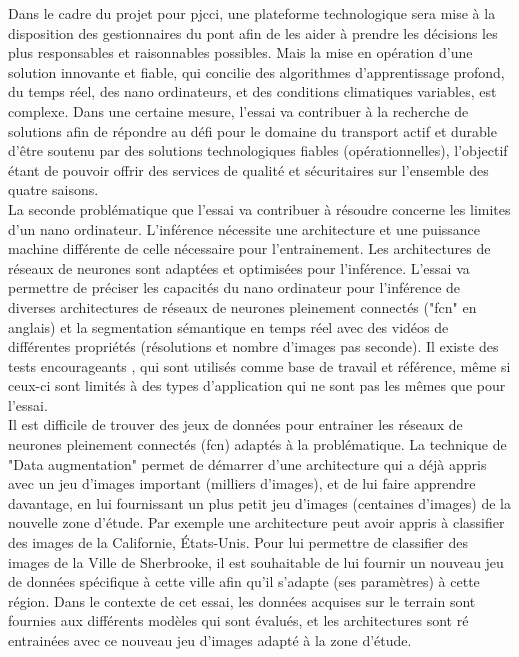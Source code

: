 ﻿\noindent Dans le cadre du projet pour \acrshort{pjcci}, une plateforme technologique sera mise à la disposition des gestionnaires du pont afin de les aider à prendre les décisions les plus responsables et raisonnables possibles. Mais la mise en opération d'une solution innovante et fiable, qui concilie des algorithmes d'apprentissage profond, du temps réel, des nano ordinateurs, et des conditions climatiques variables, est complexe. Dans une certaine mesure, l'essai va contribuer à la recherche de solutions afin de répondre au défi pour le domaine du transport actif et durable d'être soutenu par des solutions technologiques fiables (opérationnelles), l'objectif étant de pouvoir offrir des services de qualité et sécuritaires sur l'ensemble des quatre saisons.
\vspace{\baselineskip}
\\
\noindent La seconde problématique que l'essai va contribuer à résoudre concerne les limites d'un nano ordinateur. L'inférence nécessite une architecture et une puissance machine différente de celle nécessaire pour l'entrainement. Les architectures de réseaux de neurones sont adaptées et optimisées pour l'inférence. L'essai va permettre de préciser les capacités du nano ordinateur pour l'inférence de diverses architectures de réseaux de neurones pleinement connectés ("\acrshort{fcn}" en anglais) et la segmentation sémantique en temps réel avec des vidéos de différentes propriétés (résolutions et nombre d'images pas seconde). Il existe des tests encourageants \parencite{nvidia_jetson_2019-1, nguyen_mavnet_2019,zheng_real-time_2020}, qui sont utilisés comme base de travail et référence, même si ceux-ci sont limités à des types d'application qui ne sont pas les mêmes que pour l'essai.
\vspace{\baselineskip}
\\
\noindent Il est difficile de trouver des jeux de données pour entrainer les réseaux de neurones pleinement connectés (\acrshort{fcn}) adaptés à la problématique. La technique de "Data augmentation" permet de démarrer d'une architecture qui a déjà appris avec un jeu d'images important (milliers d'images), et de lui faire apprendre davantage, en lui fournissant un plus petit jeu d'images (centaines d'images) de la nouvelle zone d'étude. Par exemple une architecture peut avoir appris à classifier des images de la Californie, États-Unis. Pour lui permettre de classifier des images de la Ville de Sherbrooke, il est souhaitable de lui fournir un nouveau jeu de données spécifique à cette ville afin qu'il s'adapte (ses paramètres) à cette région. Dans le contexte de cet essai, les données acquises sur le terrain sont fournies aux différents modèles qui sont évalués, et les architectures sont ré entrainées avec ce nouveau jeu d'images adapté à la zone d'étude.
